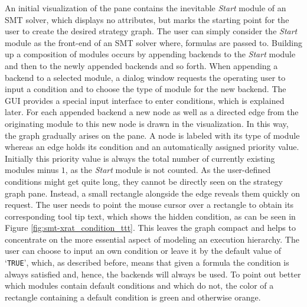 An initial visualization of the pane contains the inevitable \emph{Start} 
module of an SMT solver, which displays no attributes, but marks the 
starting point for the user to create the desired strategy graph. 
The user can simply consider the \emph{Start} module as the front-end of an 
SMT solver where, \eg \supportedLogics formulas are passed to. Building up a composition of 
modules occurs by appending backends to the \emph{Start} module and then to 
the newly appended backends and so forth. When appending a backend to a 
selected module, a dialog window requests the operating user to input a 
condition and to choose the type of \smtrat module for the new backend. 
The GUI provides a special input interface to enter conditions, which is 
explained later. For each appended backend a new node as well as a directed 
edge from the originating module to this new node is drawn in the visualization. 
In this way, the graph gradually arises on the pane.  A node is labeled with its 
type of \smtrat module whereas an edge holds its condition and an automatically 
assigned priority value. Initially this priority value is always the total number 
of currently existing modules minus $1$, as the \emph{Start} module is not 
counted. As the user-defined conditions might get quite long, they cannot be directly 
seen on the strategy graph pane. Instead, a small rectangle alongside the 
edge reveals them quickly on request. The user needs to point the mouse cursor 
over a rectangle to obtain its corresponding tool tip text, which shows the 
hidden condition, as can be seen in Figure \ref{fig:smt-xrat_condition_ttt}.
This leaves the graph compact and helps to concentrate on the more essential 
aspect of modeling an execution hierarchy. The user can choose to input an 
own condition or leave it by the default value of `\texttt{TRUE}', which, as 
described before, means that given a formula the condition is always satisfied and,
hence, the backends will always be used. 
To point out better which modules contain default conditions and which do not,
the color of a rectangle containing a default condition is green and otherwise 
orange.

